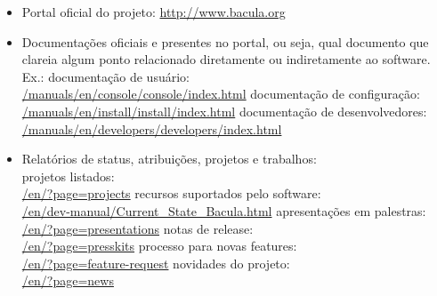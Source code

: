 \begin{itemize}
\item Portal oficial do projeto: \small\url{http://www.bacula.org}
\item Documentações oficiais e presentes no portal, ou seja, qual documento que clareia algum ponto relacionado diretamente ou indiretamente ao software. Ex.:
 \subitem documentação de usuário: \\                                    \small\url{/manuals/en/console/console/index.html}
 \subitem documentação de configuração: \\ \small\url{/manuals/en/install/install/index.html}
 \subitem documentação de desenvolvedores:\\ \small\url{/manuals/en/developers/developers/index.html}
\item Relatórios de status, atribuições, projetos e trabalhos: \\
\subitem projetos listados: \\
 \small\url{/en/?page=projects}
\subitem recursos suportados pelo software:\\
 \small\url{/en/dev-manual/Current_State_Bacula.html}
\subitem apresentações em palestras: \\
\small\url{/en/?page=presentations}
\subitem notas de release: \\
 \small\url{/en/?page=presskits}
\subitem processo para novas features: \\
 \small\url{/en/?page=feature-request}
\subitem novidades do projeto: \\
\small\url{/en/?page=news}


\end{itemize}
